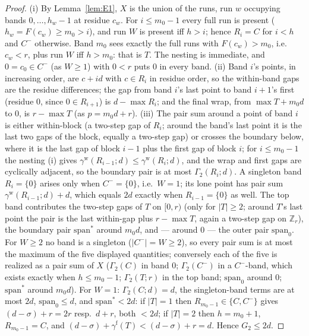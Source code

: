 \documentclass[11pt,a4paper]{article}
\numberwithin{equation}{section}
\theoremstyle{plain}
\theoremstyle{plain}
\theoremstyle{definition}
\theoremstyle{remark}
\newcommand{\Z}{\mathbb{Z}}
\begin{document}
\begin{proof}
(i) By Lemma~\ref{lem:E1}, $X$ is the union of the runs, run $w$
occupying bands $0,\dots,h_w-1$ at residue $c_w$. For $i\le m_0-1$ every
full run is present ($h_w=F(c_w)\ge m_0>i$), and run $W$ is present iff
$h>i$; hence $R_i=C$ for $i<h$ and $C^-$ otherwise. Band $m_0$ sees
exactly the full runs with $F(c_w)>m_0$, i.e.\ $c_w<r$, plus run $W$ iff
$h>m_0$: that is $T$. The nesting is immediate, and $0=c_0\in C^-$ (as
$W\ge1$) with $0<r$ puts $0$ in every band. (ii) Band $i$'s points, in
increasing order, are $c+id$ with $c\in R_i$ in residue order, so the
within-band gaps are the residue differences; the gap from band $i$'s
last point to band $i{+}1$'s first (residue $0$, since $0\in
R_{i+1}$) is $d-\max R_i$; and the final wrap, from $\max T+m_0d$ to
$0$, is $r-\max T$ (as $p=m_0d+r$). (iii) The pair sum around a point
of band $i$ is either within-block (a two-step gap of $R_i$; around the
band's last point it is the last two gaps of the block, equally a
two-step gap) or crosses the boundary below, where it is the last gap
of block $i-1$ plus the first gap of block $i$; for $i\le m_0-1$ the
nesting (i) gives $\gamma^{\mathrm w}(R_{i-1};d)\le\gamma^{\mathrm
w}(R_i;d)$, and the wrap and first gaps are cyclically adjacent, so the
boundary pair is at most $\Gamma_2(R_i;d)$. A singleton band $R_i=\{0\}$
arises only when $C^-=\{0\}$, i.e.\ $W=1$; its lone point has pair sum
$\gamma^{\mathrm w}(R_{i-1};d)+d$, which equals $2d$ exactly when
$R_{i-1}=\{0\}$ as well. The top band contributes the two-step gaps of
$T$ on $[0,r)$ (only for $|T|\ge2$; around $T$'s last point the pair is
the last within-gap plus $r-\max T$, again a two-step gap on $\Z_r$),
the boundary pair $\mathrm{span}^\ast$ around $m_0d$, and --- around
$0$ --- the outer pair $\mathrm{span}_0$. For $W\ge2$ no band is a
singleton ($|C^-|=W\ge2$), so every pair sum is at most the maximum of
the five displayed quantities; conversely each of the five is realized
as a pair sum of $X$ ($\Gamma_2(C)$ in band $0$; $\Gamma_2(C^-)$ in a
$C^-$-band, which exists exactly when $h\le m_0-1$; $\Gamma_2(T;r)$ in
the top band; $\mathrm{span}_0$ around $0$; $\mathrm{span}^\ast$ around
$m_0d$). For $W=1$: $\Gamma_2(C;d)=d$, the singleton-band terms are at
most $2d$, $\mathrm{span}_0\le d$, and $\mathrm{span}^\ast<2d$: if $|T|=1$
then $R_{m_0-1}\in\{C,C^-\}$ gives $(d-\sigma)+r=2r$ resp.\ $d+r$,
both $<2d$; if $|T|=2$ then $h=m_0+1$, $R_{m_0-1}=C$, and
$(d-\sigma)+\gamma^{\mathrm f}(T)<(d-\sigma)+r=d$. Hence $G_2\le2d$.
\end{proof}
\end{document}

